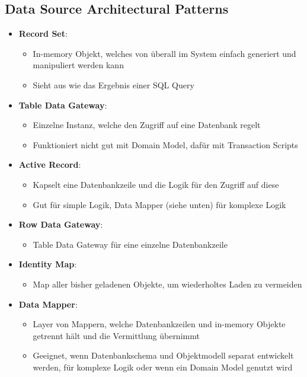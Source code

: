 \subsection{Data Source Architectural Patterns}
\label{eap:sub:data_source_architectural_patterns}


\begin{itemize}
	\item \textbf{Record Set}:
	\begin{itemize}
		\item In-memory Objekt, welches von überall im System einfach generiert und manipuliert werden kann
		\item Sieht aus wie das Ergebnis einer SQL Query
	\end{itemize}
	\item \textbf{Table Data Gateway}:
	\begin{itemize}
		\item Einzelne Instanz, welche den Zugriff auf eine Datenbank regelt
		\item Funktioniert nicht gut mit Domain Model, dafür mit Transaction Scripts
	\end{itemize}
	\item \textbf{Active Record}:
	\begin{itemize}
		\item Kapselt eine Datenbankzeile und die Logik für den Zugriff auf diese
		\item Gut für simple Logik, Data Mapper (siehe unten) für komplexe Logik
	\end{itemize}
	\item \textbf{Row Data Gateway}:
	\begin{itemize}
		\item Table Data Gateway für eine einzelne Datenbankzeile
	\end{itemize}
	\item \textbf{Identity Map}:
	\begin{itemize}
		\item Map aller bisher geladenen Objekte, um wiederholtes Laden zu vermeiden
	\end{itemize}
	\item \textbf{Data Mapper}:
	\begin{itemize}
		\item Layer von Mappern, welche Datenbankzeilen und in-memory Objekte getrennt hält und die Vermittlung übernimmt
		\item Geeignet, wenn Datenbankschema und Objektmodell separat entwickelt werden, für komplexe Logik oder wenn ein Domain Model genutzt wird
	\end{itemize}
\end{itemize}


